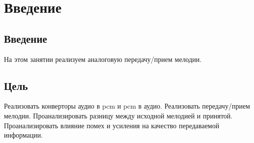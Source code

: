 \chapter{Введение}
\label{ch:intro}

\section{Введение}

На этом занятии реализуем аналоговую передачу/прием мелодии.

\section{Цель}

Реализовать конверторы аудио в pcm и pcm в аудио. Реализовать передачу/прием мелодии. Проанализировать разницу между исходной мелодией
и принятой. Проанализировать влияние помех и усиления на качество передаваемой информации. 


\endinput